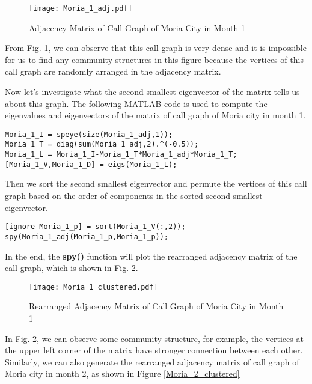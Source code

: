 \begin{figure}[ht]
\centering
\texttt{[image: Moria\_1\_adj.pdf]}
\caption{Adjacency Matrix of Call Graph of Moria City in Month 1}
\label{Moria_1_adj}
\end{figure}  

From Fig. \ref{Moria_1_adj}, we can observe that this call graph is very dense and it is impossible for us to find any community structures in this figure because the vertices of this call graph are randomly arranged in the adjacency matrix. 

Now let's investigate what the second smallest eigenvector of the  matrix tells us about this graph. The following MATLAB code is used to compute the eigenvalues and eigenvectors of the  matrix of call graph of Moria city in month 1.

\begin{lstlisting}
Moria_1_I = speye(size(Moria_1_adj,1));
Moria_1_T = diag(sum(Moria_1_adj,2).^(-0.5));
Moria_1_L = Moria_1_I-Moria_1_T*Moria_1_adj*Moria_1_T;
[Moria_1_V,Moria_1_D] = eigs(Moria_1_L);
\end{lstlisting}

Then we sort the second smallest eigenvector and permute the vertices of this call graph based on the order of components in the sorted second smallest eigenvector.  

\begin{lstlisting}
[ignore Moria_1_p] = sort(Moria_1_V(:,2));
spy(Moria_1_adj(Moria_1_p,Moria_1_p));
\end{lstlisting} 

In the end, the \textbf{spy()} function will plot the rearranged adjacency matrix of the call graph, which is shown in Fig. \ref{Moria_1_clustered}. 

\begin{figure}[ht]
\centering
\texttt{[image: Moria\_1\_clustered.pdf]}
\caption{Rearranged Adjacency Matrix of Call Graph of Moria City in Month 1}
\label{Moria_1_clustered}
\end{figure} 

In Fig. \ref{Moria_1_clustered}, we can observe some community structure, for example, the vertices at the upper left corner of the matrix have stronger connection between each other. Similarly, we can also generate the rearranged adjacency matrix of call graph of Moria city in month 2, as shown in Figure \ref{Moria_2_clustered} 


